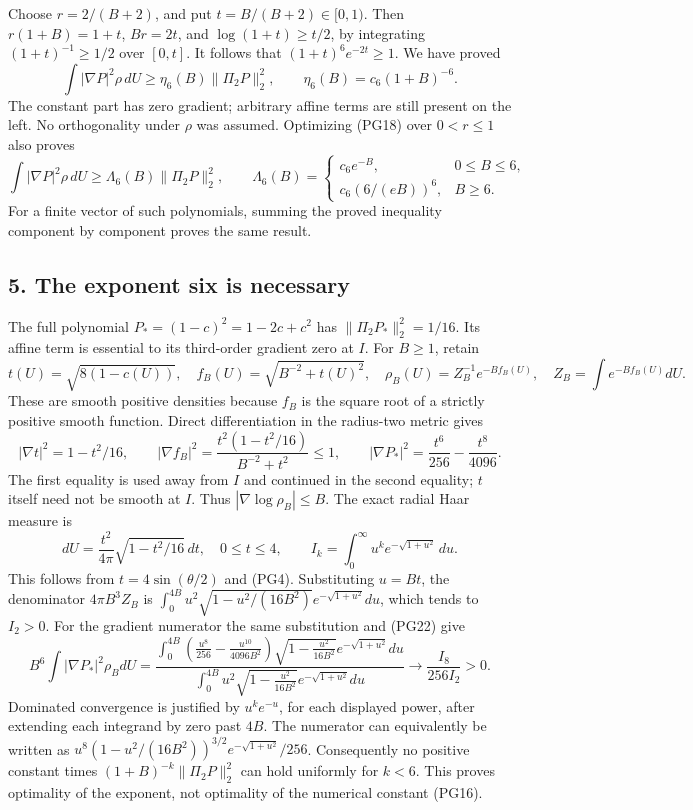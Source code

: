 \documentclass[11pt]{article}
\begin{document}
Choose \(r=2/(B+2)\), and put \(t=B/(B+2)\in[0,1)\).
Then \(r(1+B)=1+t\), \(Br=2t\), and
\(\log(1+t)\ge t/2\), by integrating
\((1+t)^{-1}\ge1/2\) over \([0,t]\). It follows that
\((1+t)^6e^{-2t}\ge1\). We have proved
\[
 \boxed{\displaystyle
 \int|\nabla P|^2\rho\,dU\ge
       \eta_6(B)\|\Pi_2P\|_2^2,\qquad
 \eta_6(B)=c_6(1+B)^{-6}.}
 \tag{PG19}
\]
The constant part has zero gradient; arbitrary affine terms are
still present on the left. No orthogonality under \(\rho\) was assumed.
Optimizing (PG18) over \(0<r\le1\) also proves
\[
 \int|\nabla P|^2\rho\,dU\ge\Lambda_6(B)\|\Pi_2P\|_2^2,\qquad
 \Lambda_6(B)=
 \begin{cases}c_6e^{-B},&0\le B\le6,\\
 c_6(6/(eB))^6,&B\ge6.
 \end{cases}
 \tag{PG20}
\]
For a finite vector of such polynomials, summing the proved
inequality component by component proves the same result.

\subsection*{5. The exponent six is necessary}

The full polynomial \(P_*=(1-c)^2=1-2c+c^2\) has
\(\|\Pi_2P_*\|_2^2=1/16\). Its affine term is essential to its
third-order gradient zero at \(I\). For \(B\ge1\), retain
\[
 t(U)=\sqrt{8(1-c(U))},\quad
 f_B(U)=\sqrt{B^{-2}+t(U)^2},\quad
 \rho_B(U)=Z_B^{-1}e^{-Bf_B(U)},\quad
 Z_B=\int e^{-Bf_B(U)}dU .
 \tag{PG21}
\]
These are smooth positive densities because \(f_B\) is the square
root of a strictly positive smooth function. Direct differentiation
in the radius-two metric gives
\[
 |\nabla t|^2=1-t^2/16,\qquad
 |\nabla f_B|^2=
 \frac{t^2(1-t^2/16)}{B^{-2}+t^2}\le1,\qquad
 |\nabla P_*|^2=\frac{t^6}{256}-\frac{t^8}{4096}.
 \tag{PG22}
\]
The first equality is used away from \(I\) and continued in the
second equality; \(t\) itself need not be smooth at \(I\).
Thus \(|\nabla\log\rho_B|\le B\). The exact radial Haar measure is
\[
 dU=\frac{t^2}{4\pi}\sqrt{1-t^2/16}\,dt,\quad0\le t\le4,\qquad
 I_k=\int_0^\infty u^k e^{-\sqrt{1+u^2}}\,du .
 \tag{PG23}
\]
This follows from \(t=4\sin(\theta/2)\) and (PG4).
Substituting \(u=Bt\), the denominator \(4\pi B^3Z_B\) is
\(\int_0^{4B}u^2\sqrt{1-u^2/(16B^2)}
e^{-\sqrt{1+u^2}}du\), which tends to \(I_2>0\).
For the gradient numerator the same substitution and (PG22) give
\[
 B^6\int|\nabla P_*|^2\rho_BdU
 =\frac{\displaystyle\int_0^{4B}
  \left(\frac{u^8}{256}-\frac{u^{10}}{4096B^2}\right)
       \sqrt{1-\frac{u^2}{16B^2}}e^{-\sqrt{1+u^2}}du}
 {\displaystyle\int_0^{4B}u^2
       \sqrt{1-\frac{u^2}{16B^2}}e^{-\sqrt{1+u^2}}du}
 \longrightarrow \frac{I_8}{256I_2}>0 .
 \tag{PG24}
\]
Dominated convergence is justified by \(u^k e^{-u}\), for each
displayed power, after extending each integrand by zero past \(4B\).
The numerator can equivalently be written as
\(u^8(1-u^2/(16B^2))^{3/2}e^{-\sqrt{1+u^2}}/256\).
Consequently no positive constant times \((1+B)^{-k}\|\Pi_2P\|_2^2\)
can hold uniformly for \(k<6\). This proves optimality of the
exponent, not optimality of the numerical constant (PG16).
\end{document}
